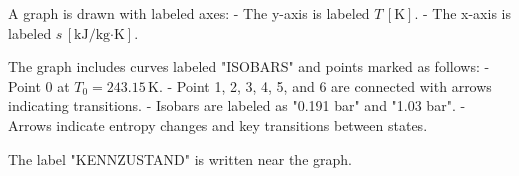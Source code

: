 A graph is drawn with labeled axes:  
- The y-axis is labeled \( T \, [\text{K}] \).  
- The x-axis is labeled \( s \, [\text{kJ/kg·K}] \).  

The graph includes curves labeled "ISOBARS" and points marked as follows:  
- Point 0 at \( T_0 = 243.15 \, \text{K} \).  
- Point 1, 2, 3, 4, 5, and 6 are connected with arrows indicating transitions.  
- Isobars are labeled as "0.191 bar" and "1.03 bar".  
- Arrows indicate entropy changes and key transitions between states.  

The label "KENNZUSTAND" is written near the graph.